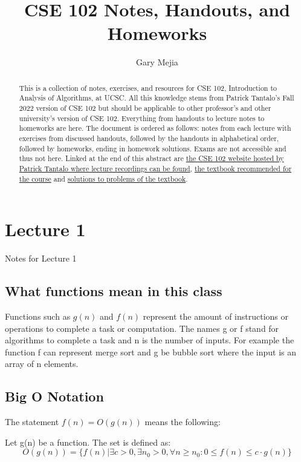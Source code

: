 \documentclass{article}
\title{CSE 102 Notes, Handouts, and Homeworks}
\author{Gary Mejia}
\date{}
\begin{document}
\maketitle

\begin{abstract}
    This is a collection of notes, exercises, and resources for CSE 102, Introduction to Analysis of Algorithms, at UCSC. All this knowledge stems from Patrick Tantalo's Fall 2022 version of CSE 102 but should be applicable to other professor's and other university's version of CSE 102. Everything from handouts to lecture notes to homeworks are here. The document is ordered as follows: notes from each lecture with exercises from discussed handouts, followed by the handouts in alphabetical order, followed by homeworks, ending in homework solutions. Exams are not accessible and thus not here. Linked at the end of this abstract are \href{https://classes.soe.ucsc.edu/cse102/Fall22/}{the CSE 102 website hosted by Patrick Tantalo where lecture recordings can be found}, \href{https://drive.google.com/file/d/1iq3etgnxh6Rh9yO163z4owxypczFhVRB/view?usp=sharing}{the textbook recommended for the course} and \href{https://sites.math.rutgers.edu/~ajl213/CLRS/CLRS.html}{solutions to problems of the textbook}.
\end{abstract}

\section{Lecture 1}

Notes for Lecture 1

\subsection{What functions mean in this class}

Functions such as $g(n)$ and $f(n)$ represent the amount of instructions or operations to complete a task or computation. The names g or f stand for algorithms to complete a task and n is the number of inputs. For example the function f can represent merge sort and g be bubble sort where the input is an array of n elements.

\subsection{Big O Notation}

The statement $f(n) = O(g(n)) $ means the following:

Let g(n) be a function. The set is defined as:
$$ O(g(n)) = \{ f(n) | \exists c > 0 , \exists n_0 > 0, \forall n \geq n_0 : 0 \leq f(n) \leq c \cdot g(n) \}$$ 
\end{document}
